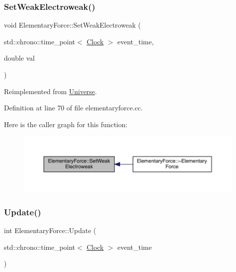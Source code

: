 \subsubsection{\texorpdfstring{Set\+Weak\+Electroweak()}{SetWeakElectroweak()}}
{\footnotesize\ttfamily void Elementary\+Force\+::\+Set\+Weak\+Electroweak (\begin{DoxyParamCaption}\item[{std\+::chrono\+::time\+\_\+point$<$ \hyperlink{universe_8h_a0ef8d951d1ca5ab3cfaf7ab4c7a6fd80}{Clock} $>$}]{event\+\_\+time,  }\item[{double}]{val }\end{DoxyParamCaption})\hspace{0.3cm}{\ttfamily [virtual]}}



Reimplemented from \hyperlink{class_universe_a2d3d642bfdc863248e93535832fa4b00}{Universe}.



Definition at line 70 of file elementaryforce.\+cc.

Here is the caller graph for this function\+:
\nopagebreak
\begin{figure}[H]
\begin{center}
\leavevmode
\includegraphics[width=350pt]{class_elementary_force_a38d4f86f18a9f84a4198ee43bc90f6b4_icgraph}
\end{center}
\end{figure}
\mbox{\label{class_elementary_force_a855c26eb8a542ff633af66940da5f90b}} 
\subsubsection{\texorpdfstring{Update()}{Update()}}
{\footnotesize\ttfamily int Elementary\+Force\+::\+Update (\begin{DoxyParamCaption}\item[{std\+::chrono\+::time\+\_\+point$<$ \hyperlink{universe_8h_a0ef8d951d1ca5ab3cfaf7ab4c7a6fd80}{Clock} $>$}]{event\+\_\+time }\end{DoxyParamCaption})}



